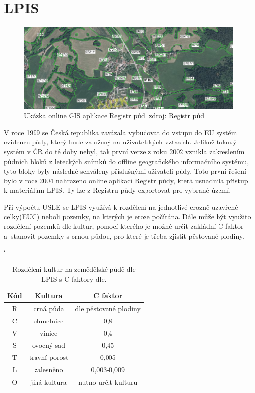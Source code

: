 \section{LPIS}
\begin{figure}[H]
    \centering \includegraphics[scale=0.7]{./pictures/lpis.png}
      \caption[Ukázka GIS online aplikace Registr půd]{Ukázka online
        GIS aplikace Registr půd, zdroj: Registr půd\cite{lpis}}
      \label{fig:lpis}
\end{figure}
V roce 1999 se Česká republika zavázala vybudovat do vstupu do EU
systém evidence půdy, který bude založený na uživatelských
vztazích. Jelikož takový systém v ČR do té doby nebyl, tak první verze
z roku 2002 vznikla zakreslením půdních bloků z leteckých snímků do
offline geografického informačního systému, tyto bloky byly následně
schváleny příslušnými uživateli půdy. Toto první řešení bylo v roce
2004 nahrazeno online aplikací Registr půdy\cite{lpis}, která
usnadnila přístup k materiálům LPIS. Ty lze z Registru půdy exportovat
pro vybrané území.\cite{lpis}

Při výpočtu USLE se LPIS využívá k rozdělení na jednotlivé erozně
uzavřené celky(EUC) neboli pozemky, na kterých je eroze počítána. Dále
může být využito rozdělení pozemků dle kultur, pomocí kterého je možné
určit zakládní C faktor a~stanovit pozemky s ornou půdou, pro které je
třeba zjistit pěstované plodiny.\cite{Novotny2014}
\begin{table}[!h]
\begin{center}
\catcode`
    \noindent\begin{tabular}{|*{3}{c|}} \hline \bf Kód & \bf Kultura &
    \bf C faktor\\ \hline R & orná půda & dle pěstované
    plodiny\\ \hline C & chmelnice & 0,8\\ \hline V & vinice &
    0,4\\ \hline S & ovocný sad & 0,45\\ \hline T & travní porost &
    0,005\\ \hline L & zalesněno & 0,003-0,009\\ \hline O & jiná
    kultura & nutno určit kulturu\\ \hline
    \end{tabular}\\
  \caption[Rozdělení kultur na zemědělské půdě dle LPIS]{Rozdělení
    kultur na zemědělské půdě dle LPIS\cite{lpis} s C faktory
    dle\cite{janecek2012}.}
  \label{tabulka_ohrozenost}
\end{center}
\end{table}
\FloatBarrier
